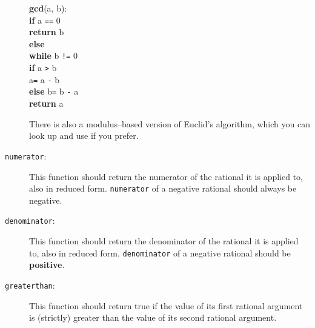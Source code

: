 \documentclass[11pt]{article}
\begin{document}
\begin{description}
\begin{minipage}[t]{3in}
\begin{tabbing}
                \textbf{gcd}(a, b):
                  \\

                  \> \textbf{if} a \texttt{==} 0
                    \\

                    \> \> \textbf{return} b
                      \\

                  \> \textbf{else}
                    \\

                    \> \> \textbf{while} b \texttt{!=} 0
                      \\

                      \> \> \> \textbf{if} a \texttt{>} b
                        \\

                        \> \> \> \> a\texttt{=} a \texttt{-} b
                          \\

                      \> \> \> \textbf{else} b\texttt{=} b \texttt{-} a
                        \\

                    \> \> \textbf{return} a

              \end{tabbing}

            \end{minipage}

            \smallskip

            There is also a modulus--based version of Euclid's algorithm,
            which you can look up and use if you prefer.

      \item[\texttt{\textmd{numerator}}:] This function should return the
            numerator of the rational it is applied to, also in reduced
            form.  \texttt{numerator} of a negative rational should always
            be negative.

      \item[\texttt{\textmd{denominator}}:] This function should return
            the denominator of the rational it is applied to, also in
            reduced form.  \texttt{denominator} of a negative rational
            should be \textbf{positive}.

      \item[\texttt{\textmd{greaterthan}}:] This function should return
            true if the value of its first rational argument is (strictly)
            greater than the value of its second rational argument.


\end{description}
\end{document}
